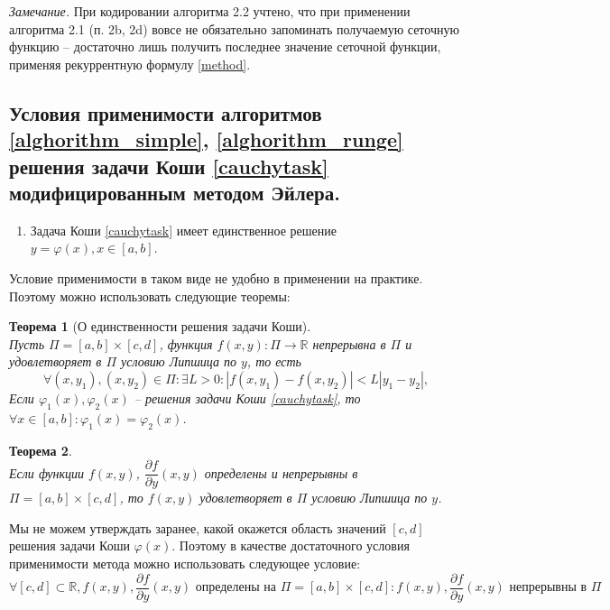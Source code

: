 \documentclass[a4paper, 12pt]{article}
\newtheorem{theorem}{Теорема}
\begin{document}
	\textit{Замечание.} При кодировании алгоритма 2.2 учтено, что при применении алгоритма 2.1 (п. 2b, 2d) вовсе не обязательно запоминать получаемую сеточную функцию -- достаточно лишь получить последнее значение сеточной функции, применяя рекуррентную формулу \eqref{method}. 

	\subsection{Условия применимости алгоритмов \ref{alghorithm_simple}, \ref{alghorithm_runge} решения задачи Коши \eqref{cauchytask} модифицированным методом Эйлера.}
	
	\begin{enumerate}
		\item Задача Коши \eqref{cauchytask} имеет единственное решение $y=\varphi(x), x\in[a,b]$.
	\end{enumerate}

	Условие применимости в таком виде не удобно в применении на практике. Поэтому можно использовать следующие теоремы:
	\begin{theorem}[О единственности решения задачи Коши] \label{lipschizoncauchyunique} ~\\
		Пусть $\Pi=[a,b]\times[c,d]$, функция $f(x,y) : \Pi \rightarrow \mathbb{R}$ непрерывна в $\Pi$ и удовлетворяет в $\Pi$ условию Липшица по $y$, то есть
		\begin{equation}
			\forall (x,y_1),(x,y_2)\in\Pi : \exists L>0 : |f(x,y_1)-f(x,y_2)|<L|y_1-y_2|,
		\end{equation}
		Если $\varphi_1(x),\varphi_2(x)$ -- решения задачи Коши \eqref{cauchytask}, то $\forall x\in[a,b]:\varphi_1(x)=\varphi_2(x)$.
	\end{theorem}

	\begin{theorem} \label{lipschiz} ~\\
		Если функции $f(x,y)$, $\dfrac{\partial f}{\partial y}(x,y)$ определены и непрерывны в $\Pi=[a,b]\times[c,d]$, то $f(x,y)$ удовлетворяет в $\Pi$ условию Липшица по $y$.
	\end{theorem}
	
	Мы не можем утверждать заранее, какой окажется область значений $[c,d]$ решения задачи Коши $\varphi(x)$. Поэтому в качестве достаточного условия применимости метода можно использовать следующее условие:
	\begin{equation*}
		\forall [c,d]\subset\mathbb{R}, f(x,y),\dfrac{\partial f}{\partial y}(x,y) \text{ определены на } \Pi=[a,b]\times[c,d] : f(x,y), \dfrac{\partial f}{\partial y}(x,y) \text{ непрерывны в } \Pi 
	\end{equation*}
	
\end{document}
